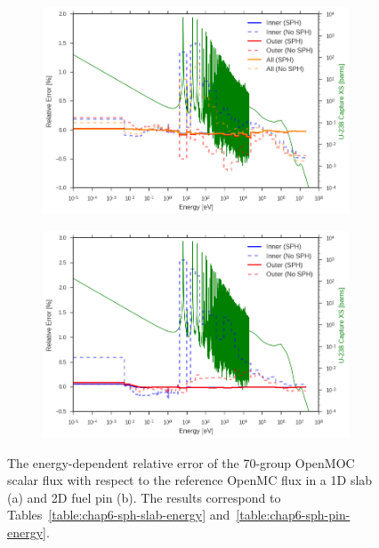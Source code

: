 \begin{figure}[h!]
\begin{subfigure}{.9\textwidth}
  \centering
  \includegraphics[width=\linewidth]{figures/sph/slab/rel-err-inner-outer}
  \caption{}
\end{subfigure}
\begin{subfigure}{.9\textwidth}
  \centering
  \includegraphics[width=\linewidth]{figures/sph/pin-cell/rel-err-inner-outer}
  \caption{}
\end{subfigure}
\caption[Flux relative error by energy group w/ SPH]{The energy-dependent relative error of the 70-group OpenMOC scalar flux with respect to the reference OpenMC flux in a 1D slab (a) and 2D fuel pin (b). The results correspond to Tables~\ref{table:chap6-sph-slab-energy} and~\ref{table:chap6-sph-pin-energy}.}
\label{fig:chap6-rel-err-energy}
\end{figure}

